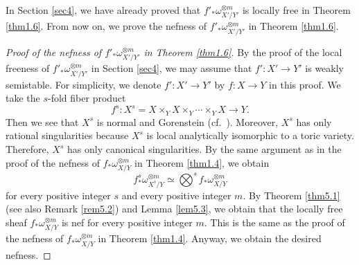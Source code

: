 \documentclass[12pt,twoside]{amsart}
\theoremstyle{definition}
\begin{document}
In Section \ref{sec4}, we have already proved that 
$f'_*\omega^{\otimes m}_{X'/Y'}$ 
is locally free in Theorem \ref{thm1.6}. 
From now on, we prove the nefness of 
$f'_*\omega^{\otimes m}_{X'/Y'}$ in Theorem \ref{thm1.6}. 

\begin{proof}[Proof of the nefness of 
$f'_*\omega^{\otimes m}_{X'/Y'}$ in Theorem \ref{thm1.6}]
By the proof of the local freeness of $f'_*\omega^{\otimes m}_{X'/Y'}$ in 
Section \ref{sec4}, we may assume that $f': X'\to Y'$ is 
weakly semistable. 
For simplicity, we denote $f':X'\to Y'$ by $f:X\to Y$ in this proof.  
We take the $s$-fold fiber product 
$$
f^s:X^s=X\times _YX\times _Y \cdots \times _YX \to Y. 
$$ 
Then we see that $X^s$ is normal and Gorenstein (cf.~\cite[Lemma 3.5]{viehweg}). 
Moreover, $X^s$ has only rational singularities because 
$X^s$ is local analytically isomorphic to 
a toric variety. 
Therefore, $X^s$ has only canonical singularities. 
By the same argument as in the proof of 
the nefness of $f_*\omega^{\otimes m}_{X/Y}$ in 
Theorem \ref{thm1.4}, we obtain 
$$
f^s_*\omega^{\otimes m}_{X^s/Y}\simeq 
\bigotimes ^s f_*\omega^{\otimes m}_{X/Y}
$$ for every positive integer $s$ and every positive integer $m$. 
By Theorem \ref{thm5.1} (see also Remark \ref{rem5.2}) 
and Lemma \ref{lem5.3}, 
we obtain that the locally free sheaf $f_*\omega^{\otimes m}_{X/Y}$ is 
nef for every positive integer $m$. 
This is the same as the proof of the nefness of $f_*\omega^{\otimes m}
_{X/Y}$ in Theorem \ref{thm1.4}. 
Anyway, we obtain the desired nefness. 
\end{proof}
\end{document}
